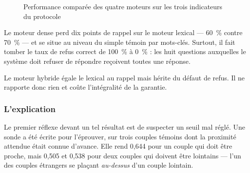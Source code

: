 \begin{figure}[H]
\centering
{}
\caption{Performance comparée des quatre moteurs sur les trois indicateurs du protocole}
\label{fig:moteurs}
\end{figure}

Le moteur dense perd dix points de rappel sur le moteur lexical --- 60~\% contre 70~\% --- et se situe au niveau du simple témoin par mots-clés. Surtout, il fait tomber le taux de refus correct de 100~\% à 0~\% : les huit questions auxquelles le système doit refuser de répondre reçoivent toutes une réponse.

Le moteur hybride égale le lexical au rappel mais hérite du défaut de refus. Il ne rapporte donc rien et coûte l'intégralité de la garantie.

\subsubsection{L'explication}

Le premier réflexe devant un tel résultat est de suspecter un seuil mal réglé. Une sonde a été écrite pour l'éprouver, sur trois couples témoins dont la proximité attendue était connue d'avance. Elle rend 0,644 pour un couple qui doit être proche, mais 0,505 et 0,538 pour deux couples qui doivent être lointains --- l'un des couples étrangers se plaçant \emph{au-dessus} d'un couple lointain.

